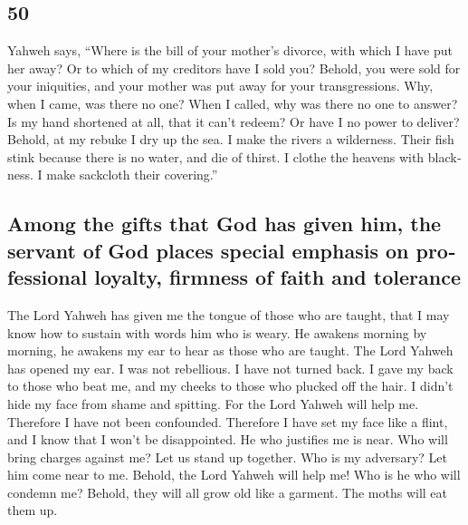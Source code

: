\begin{paracol}{2}
\begin{otherlanguage}{english}
\hypertarget{section-99}{%
\section{50}\label{section-99}}

 Yahweh says, ``Where is the bill of your mother's
divorce, with which I have put her away? Or to which of my creditors
have I sold you? Behold, you were sold for your iniquities, and your
mother was put away for your transgressions.  Why, when I
came, was there no one? When I called, why was there no one to answer?
Is my hand shortened at all, that it can't redeem? Or have I no power to
deliver? Behold, at my rebuke I dry up the sea. I make the rivers a
wilderness. Their fish stink because there is no water, and die of
thirst.  I clothe the heavens with blackness. I make
sackcloth their covering.''

\hypertarget{among-the-gifts-that-god-has-given-him-the-servant-of-god-places-special-emphasis-on-professional-loyalty-firmness-of-faith-and-tolerance}{%
\subsection{Among the gifts that God has given him, the servant of God
places special emphasis on professional loyalty, firmness of faith and
tolerance}\label{among-the-gifts-that-god-has-given-him-the-servant-of-god-places-special-emphasis-on-professional-loyalty-firmness-of-faith-and-tolerance}}

 The Lord Yahweh has given me the tongue of those who are
taught, that I may know how to sustain with words him who is weary. He
awakens morning by morning, he awakens my ear to hear as those who are
taught.  The Lord Yahweh has opened my ear. I was not
rebellious. I have not turned back.  I gave my back to
those who beat me, and my cheeks to those who plucked off the hair. I
didn't hide my face from shame and spitting.  For the Lord
Yahweh will help me. Therefore I have not been confounded. Therefore I
have set my face like a flint, and I know that I won't be disappointed.
 He who justifies me is near. Who will bring charges
against me? Let us stand up together. Who is my adversary? Let him come
near to me.  Behold, the Lord Yahweh will help me! Who is
he who will condemn me? Behold, they will all grow old like a garment.
The moths will eat them up.

\hypertarget{encourage-the-godly-and-threaten-violent-and-ungodly-opponents}{%
}
\end{otherlanguage}
\end{paracol}
